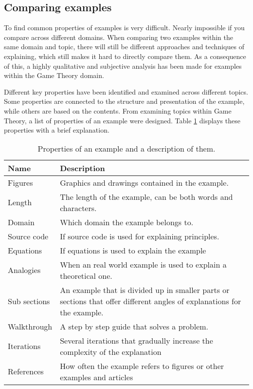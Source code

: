 \subsection{Comparing examples} \label{comparing_examples}

To find common properties of examples is very difficult. Nearly impossible if you compare across different domains. When comparing two examples within the same domain and topic, there will still be different approaches and techniques of explaining, which still makes it hard to directly compare them. As a consequence of this, a highly qualitative and subjective analysis has been made for examples within the Game Theory domain. 

Different key properties have been identified and examined across different topics. Some properties are connected to the structure and presentation of the example, while others are based on the contents. From examining topics within Game Theory, a list of properties of an example were designed. Table \ref{table:1} displays these properties with a brief explanation.

\begin{table}[h!]
\centering
\begin{tabular} {|| p{5em} | p{23em} ||} 
 \hline
 Name & Description \\ [0.5ex] 
 \hline\hline
 Figures & Graphics and drawings contained in the example. \\ 
 Length & The length of the example, can be both words and characters. \\
 Domain & Which domain the example belongs to. \\
 Source code & If source code is used for explaining principles. \\
 Equations & If equations is used to explain the example \\
 Analogies & When an real world example is used to explain a theoretical one. \\
 Sub sections & An example that is divided up in smaller parts or sections that offer different angles of explanations for the example. \\
 Walkthrough & A step by step guide that solves a problem. \\
 Iterations & Several iterations that gradually increase the complexity of the explanation \\
 References & How often the example refers to figures or other examples and articles \\ [1ex] 
 \hline
\end{tabular}
\caption{Properties of an example and a description of them.}
\label{table:1}
\end{table}


